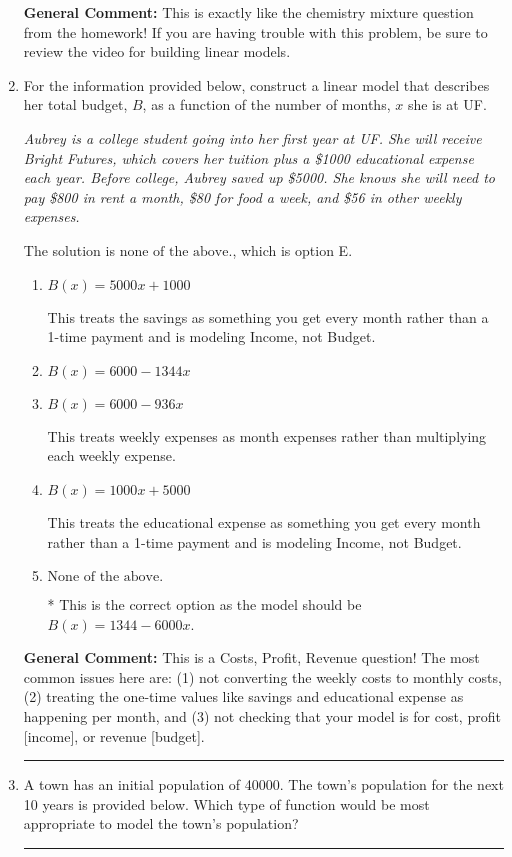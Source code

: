 \documentclass{extbook}[14pt]
\newcommand{\litem}[1]{\item #1

\rule{\textwidth}{0.4pt}}
\begin{document}
\begin{enumerate}
{\textbf{General Comment:} This is exactly like the chemistry mixture question from the homework! If you are having trouble with this problem, be sure to review the video for building linear models.
}
\litem{
For the information provided below, construct a linear model that describes her total budget, $B$, as a function of the number of months, $x$ she is at UF.

\begin{center}
    \textit{ Aubrey is a college student going into her first year at UF. She will receive Bright Futures, which covers her tuition plus a \$1000 educational expense each year. Before college, Aubrey saved up \$5000. She knows she will need to pay \$800 in rent a month, \$80 for food a week, and \$56 in other weekly expenses. }
\end{center}


The solution is \( \text{none of the above.} \), which is option E.\begin{enumerate}[label=\Alph*.]
\item \( B(x) = 5000 x + 1000 \)

This treats the savings as something you get every month rather than a 1-time payment and is modeling Income, not Budget.
\item \( B(x) = 6000 - 1344 x \)


\item \( B(x) = 6000 - 936 x \)

This treats weekly expenses as month expenses rather than multiplying each weekly expense.
\item \( B(x) = 1000 x + 5000 \)

This treats the educational expense as something you get every month rather than a 1-time payment and is modeling Income, not Budget.
\item \( \text{None of the above.} \)

* This is the correct option as the model should be $B(x) = 1344 - 6000 x$.
\end{enumerate}

\textbf{General Comment:} This is a Costs, Profit, Revenue question! The most common issues here are: (1) not converting the weekly costs to monthly costs, (2) treating the one-time values like savings and educational expense as happening per month, and (3) not checking that your model is for cost, profit [income], or revenue [budget].
}
\litem{
A town has an initial population of 40000. The town's population for the next 10 years is provided below. Which type of function would be most appropriate to model the town's population?



}
\end{enumerate}
\end{document}
